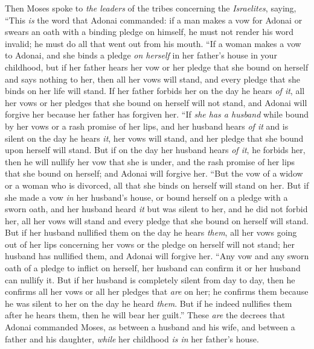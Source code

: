 \begin{biblechapter} %
 Then Moses spoke to \textit{the leaders} of the tribes concerning the \textit{Israelites}, saying, “This \textit{is} the word that Adonai commanded:
\verse if a man makes a vow for Adonai or swears an oath with a binding pledge on himself, he must not render his word invalid; he must do all that went out from his mouth.
\verse “If a woman makes a vow to Adonai, and she binds a pledge \textit{on herself} in her father’s house in your childhood,
\verse but if her father hears her vow or her pledge that she bound on herself and says nothing to her, then all her vows will stand, and every pledge that she binds on her life will stand.
\verse If her father forbids her on the day he hears \textit{of it}, all her vows or her pledges that she bound on herself will not stand, and Adonai will forgive her because her father has forgiven her.
\verse “If \textit{she has a husband} while bound by her vows or a rash promise of her lips,
\verse and her husband hears \textit{of it} and is silent on the day he hears \textit{it}, her vows will stand, and her pledge that she bound upon herself will stand.
\verse But if on the day her husband hears \textit{of it}, he forbids her, then he will nullify her vow that she is under, and the rash promise of her lips that she bound on herself; and Adonai will forgive her.
\verse “But the vow of a widow or a woman who is divorced, all that she binds on herself will stand on her.
\verse But if she made a vow \textit{in} her husband’s house, or bound herself on a pledge with a sworn oath,
\verse and her husband heard \textit{it} but was silent to her, and he did not forbid her, all her vows will stand and every pledge that she bound on herself will stand.
\verse But if her husband nullified them on the day he hears \textit{them}, all her vows going out of her lips concerning her vows or the pledge on herself will not stand; her husband has nullified them, and Adonai will forgive her.
\verse “Any vow and any sworn oath of a pledge to inflict on herself, her husband can confirm it or her husband can nullify it.
\verse But if her husband is completely silent from day to day, then he confirms all her vows or all her pledges that \textit{are} on her; he confirms them because he was silent to her on the day he heard \textit{them}.
\verse But if he indeed nullifies them after he hears them, then he will bear her guilt.”
\verse These \textit{are} the decrees that Adonai commanded Moses, as between a husband and his wife, and between a father and his daughter, \textit{while} her childhood \textit{is in} her father’s house.
\end{biblechapter}

